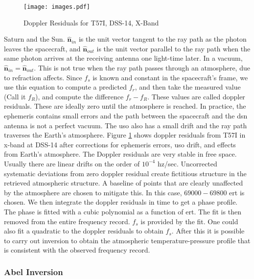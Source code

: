 \documentclass[oneside]{book}
\theoremstyle{mystyle}
\begin{document}
\begin{figure}
	\centering
    \vspace{-3ex}
	\texttt{[image: images.pdf]}
	\caption{Doppler Residuals for T57I, DSS-14, X-Band}
	\label{fig:usr_doppler_resid_titan_t57I_dss14_x}
\end{figure}

\noindent Saturn and the Sun. $\hat{\mathbf{n}}_{in}$ is the unit vector tangent to the ray path as the photon leaves the spacecraft, and $\hat{\mathbf{n}}_{out}$ is the unit vector parallel to the ray path when the same photon arrives at the receiving antenna one light-time later. In a vacuum, $\hat{\mathbf{n}}_{in} = \hat{\mathbf{n}}_{out}$. This is not true when the ray path passes through an atmosphere, due to \gls{refraction} affects. Since $f_{s}$ is known and constant in the spacecraft's frame, we use this equation to compute a predicted $f_r$, and then take the measured value (Call it $f_{R}$), and compute the difference $f_r - f_{R}$. These values are called \glspl{doppler residual}. These are ideally zero until the atmosphere is reached. In practice, the \gls{ephemeris} contains small errors and the path between the spacecraft and the \gls{dsn} antenna is not a perfect vacuum. The \gls{uso} also has a small drift and the ray path traverses the Earth's atmosphere. Figure \ref{fig:usr_doppler_resid_titan_t57I_dss14_x} shows \glspl{doppler residual} from T57I in \gls{x-band} at DSS-14 after corrections for \gls{ephemeris} errors, \gls{uso} drift, and effects from Earth's atmosphere. The Doppler residuals are very stable in free space. Usually there are linear drifts on the order of $10^{-4}$ \gls{hz}/sec. Uncorrected systematic deviations from zero \gls{doppler residual} create fictitious structure in the retrieved atmospheric structure. A baseline of points that are clearly unaffected by the atmosphere are chosen to mitigate this. In this case, $69000 - 69800$ \gls{ert} is chosen. We then integrate the \glspl{doppler residual} in time to get a phase profile. The phase is fitted with a cubic polynomial as a function of \gls{ert}. The fit is then removed from the entire frequency record. $f_{s}$ is provided by the fit. One could also fit a quadratic to the \glspl{doppler residual} to obtain $f_{s}$. After this it is possible to carry out inversion to obtain the atmospheric \gls{temperature-pressure profile} that is consistent with the observed frequency record.

\subsubsection{\footnotesize Abel Inversion}
\end{document}
